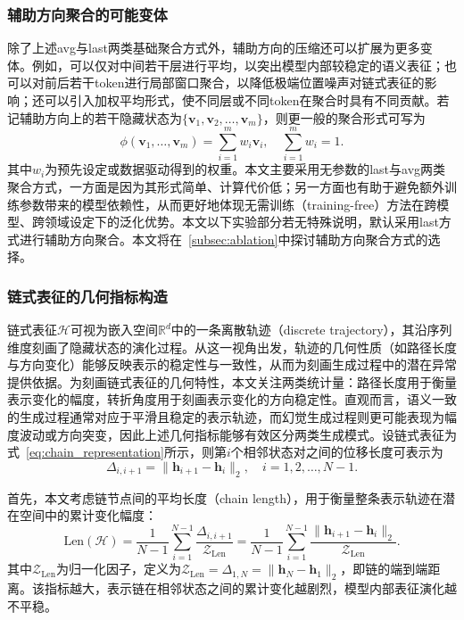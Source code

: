 \subsubsection{辅助方向聚合的可能变体}

除了上述avg与last两类基础聚合方式外，辅助方向的压缩还可以扩展为更多变体。例如，可以仅对中间若干层进行平均，以突出模型内部较稳定的语义表征；也可以对前后若干token进行局部窗口聚合，以降低极端位置噪声对链式表征的影响；还可以引入加权平均形式，使不同层或不同token在聚合时具有不同贡献。若记辅助方向上的若干隐藏状态为$\{\mathbf{v}_1,\mathbf{v}_2,\dots,\mathbf{v}_m\}$，则更一般的聚合形式可写为
\begin{equation}
\phi(\mathbf{v}_1,\dots,\mathbf{v}_m)
=
\sum_{i=1}^{m} w_i \mathbf{v}_i, \quad \sum_{i=1}^{m} w_i = 1.
\end{equation}
其中$w_i$为预先设定或数据驱动得到的权重。本文主要采用无参数的last与avg两类聚合方式，一方面是因为其形式简单、计算代价低；另一方面也有助于避免额外训练参数带来的模型依赖性，从而更好地体现无需训练（training-free）方法在跨模型、跨领域设定下的泛化优势。本文以下实验部分若无特殊说明，默认采用last方式进行辅助方向聚合。本文将在~\ref{subsec:ablation}中探讨辅助方向聚合方式的选择。

\subsubsection{链式表征的几何指标构造}

链式表征$\mathcal{H}$可视为嵌入空间$\mathbb{R}^d$中的一条离散轨迹（discrete trajectory），其沿序列维度刻画了隐藏状态的演化过程。从这一视角出发，轨迹的几何性质（如路径长度与方向变化）能够反映表示的稳定性与一致性，从而为刻画生成过程中的潜在异常提供依据。为刻画链式表征的几何特性，本文关注两类统计量：路径长度用于衡量表示变化的幅度，转折角度用于刻画表示变化的方向稳定性。直观而言，语义一致的生成过程通常对应于平滑且稳定的表示轨迹，而幻觉生成过程则更可能表现为幅度波动或方向突变，因此上述几何指标能够有效区分两类生成模式。设链式表征为式~\ref{eq:chain_representation}所示，则第$i$个相邻状态对之间的位移长度可表示为
\begin{equation}
  \Delta_{i,i+1} = \|\mathbf{h}_{i+1}-\mathbf{h}_i\|_2, \quad i=1,2,\dots,N-1.
\end{equation}

首先，本文考虑链节点间的平均长度（chain length），用于衡量整条表示轨迹在潜在空间中的累计变化幅度：
\begin{equation}
  \label{eq:chain_length}
  \mathrm{Len}(\mathcal{H})
  =
  \frac{1}{N-1}\sum_{i=1}^{N-1}\frac{\Delta_{i,i+1}}{\mathcal{Z}_\mathrm{Len}}
  =
  \frac{1}{N-1}\sum_{i=1}^{N-1}\frac{\|\mathbf{h}_{i+1}-\mathbf{h}_i\|_2}{\mathcal{Z}_\mathrm{Len}}.
\end{equation}
其中$\mathcal{Z}_\mathrm{Len}$为归一化因子，定义为$\mathcal{Z}_\mathrm{Len}=\Delta_{1,N}=\|\mathbf{h}_{N}-\mathbf{h}_1\|_2$，即链的端到端距离。该指标越大，表示链在相邻状态之间的累计变化越剧烈，模型内部表征演化越不平稳。

